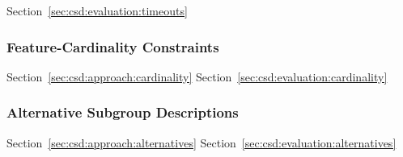 \documentclass{article}
\theoremstyle{definition}
\begin{document}
Section~\ref{sec:csd:evaluation:timeouts}

\subsubsection{Feature-Cardinality Constraints}
\label{sec:csd:experimental-design:methods:cardinality}

Section~\ref{sec:csd:approach:cardinality}
Section~\ref{sec:csd:evaluation:cardinality}

\subsubsection{Alternative Subgroup Descriptions}
\label{sec:csd:experimental-design:methods:alternatives}

Section~\ref{sec:csd:approach:alternatives}
Section~\ref{sec:csd:evaluation:alternatives}
\end{document}
